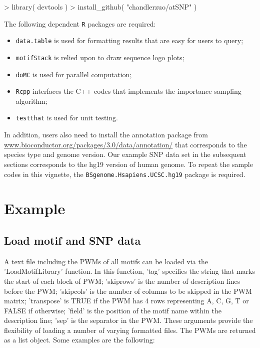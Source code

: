\documentclass[a4paper,10pt]{article}
\begin{document}
\begin{Schunk}
\begin{Sinput}
> library( devtools )
> install_github( "chandlerzuo/atSNP" )
\end{Sinput}
\end{Schunk}

The following dependent \texttt{R} packages are required:

\begin{itemize}
\item \texttt{data.table} is used for formatting results that are easy for users to query;
\item \texttt{motifStack} is relied upon to draw sequence logo plots;
\item \texttt{doMC} is used for parallel computation;
\item \texttt{Rcpp} interfaces the C++ codes that implements the importance sampling algorithm;
\item \texttt{testthat} is used for unit testing.
\end{itemize}
  
In addition, users also need to install the annotation package from \url{www.bioconductor.org/packages/3.0/data/annotation/} that corresponds to the species type and genome version. Our example SNP data set in the subsequent sections corresponds to the hg19 version of human genome. To repeat the sample codes in this vignette, the \texttt{BSgenome.Hsapiens.UCSC.hg19} package is required.

\section{Example}

\subsection{Load motif and SNP data}

A text file including the PWMs of all motifs can be loaded via the 'LoadMotifLibrary' function. In this function, 'tag' specifies the string that marks the start of each block of PWM; 'skiprows' is the number of description lines before the PWM; 'skipcols' is the number of columns to be skipped in the PWM matrix; 'transpose' is TRUE if the PWM has 4 rows representing A, C, G, T or FALSE if otherwise; 'field' is the position of the motif name within the description line; 'sep' is the separator in the PWM. These arguments provide the flexibility of loading a number of varying formatted files. The PWMs are returned as a list object. Some examples are the following:
\end{document}

